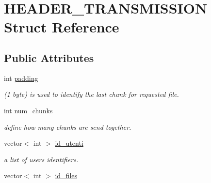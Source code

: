 \hypertarget{structHEADER__TRANSMISSION}{\section{H\-E\-A\-D\-E\-R\-\_\-\-T\-R\-A\-N\-S\-M\-I\-S\-S\-I\-O\-N Struct Reference}
\label{structHEADER__TRANSMISSION}
}
\subsection*{Public Attributes}
\begin{DoxyCompactItemize}
\item 
\hypertarget{structHEADER__TRANSMISSION_a74de1a2343e132bf28eb6e83b4601d34}{int \hyperlink{structHEADER__TRANSMISSION_a74de1a2343e132bf28eb6e83b4601d34}{padding}}\label{structHEADER__TRANSMISSION_a74de1a2343e132bf28eb6e83b4601d34}

\begin{DoxyCompactList}\small\item\em (1 byte) is used to identify the last chunk for requested file. \end{DoxyCompactList}\item 
\hypertarget{structHEADER__TRANSMISSION_abee64c077b815db300d99d1e2a273af7}{int \hyperlink{structHEADER__TRANSMISSION_abee64c077b815db300d99d1e2a273af7}{num\-\_\-chunks}}\label{structHEADER__TRANSMISSION_abee64c077b815db300d99d1e2a273af7}

\begin{DoxyCompactList}\small\item\em define how many chunks are send together. \end{DoxyCompactList}\item 
\hypertarget{structHEADER__TRANSMISSION_ae1d8e1fcc8178250b212f77325022424}{vector$<$ int $>$ \hyperlink{structHEADER__TRANSMISSION_ae1d8e1fcc8178250b212f77325022424}{id\-\_\-utenti}}\label{structHEADER__TRANSMISSION_ae1d8e1fcc8178250b212f77325022424}

\begin{DoxyCompactList}\small\item\em a list of users identifiers. \end{DoxyCompactList}\item 
\hypertarget{structHEADER__TRANSMISSION_a7d6396f1a9a35defc1b44e00c663b412}{vector$<$ int $>$ \hyperlink{structHEADER__TRANSMISSION_a7d6396f1a9a35defc1b44e00c663b412}{id\-\_\-files}}\label{structHEADER__TRANSMISSION_a7d6396f1a9a35defc1b44e00c663b412}


\end{DoxyCompactItemize}
